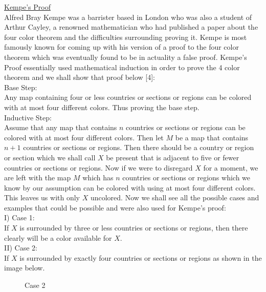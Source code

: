 \documentclass[11pt]{article}
\newcommand{\forceindent}{\leavevmode{\parindent=1.5em\indent}}
\begin{document}
\noindent \underline{Kempe's Proof}\\
Alfred Bray Kempe was a barrister based in London who was also a student of Arthur Cayley, a renowned mathematician who had published a paper about the four color theorem and the difficulties surrounding proving it. Kempe is most famously known for coming up with his version of a proof to the four color theorem which was eventually found to be in actuality a false proof. Kempe's Proof essentially used mathematical induction in order to prove the 4 color theorem and we shall show that proof below [4]: \\

\noindent Base Step:\\
Any map containing four or less countries or sections or regions can be colored with at most four different colors. Thus proving the base step.\\

\noindent Inductive Step:\\
Assume that any map that contains $n$ countries or sections or regions can be colored with at most four different colors. Then let $M$ be a map that contains $n+1$ countries or sections or regions. Then there should be a country or region or section which we shall call $X$ be present that is adjacent to five or fewer countries or sections or regions. Now if we were to disregard $X$ for a moment, we are left with the map $M$ which has $n$ countries or sections or regions which we know by our assumption can be colored with using at most four different colors. This leaves us with only $X$ uncolored. Now we shall see all the possible cases and examples that could be possible and were also used for Kempe's proof:\\
I) Case 1:\\
\forceindent If $X$ is surrounded by three or less countries or sections or regions, then there clearly will \forceindent be a color available for $X$. \\
II) Case 2:\\
\forceindent If $X$ is surrounded by exactly four countries or sections or regions as shown in the image \forceindent below.\\
\begin{figure}[ht!]
\centering
{}
\caption{Case 2} 
\end{figure}
\end{document}
